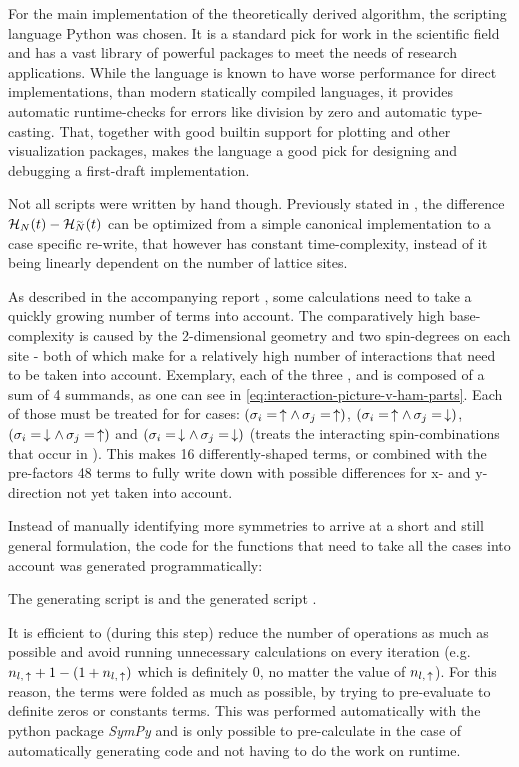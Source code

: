 For the main implementation of the theoretically derived algorithm, the scripting language Python was chosen.
It is a standard pick for work in the scientific field and has a vast library of powerful packages to meet the needs of research applications.
While the language is known to have worse performance for direct implementations, than modern statically compiled languages, it provides automatic runtime-checks for errors like division by zero and automatic type-casting.
That, together with good builtin support for plotting and other visualization packages, makes the language a good pick for designing and debugging a first-draft implementation.

Not all scripts were written by hand though.
Previously stated in , the difference $\HNOft - \HNOft[\vphantom{N}\smash{\tilde{N}}]$ can be optimized from a simple canonical implementation to a case specific re-write, that however has constant time-complexity, instead of it being linearly dependent on the number of lattice sites.

As described in the accompanying report , some calculations need to take a quickly growing number of terms into account.
The comparatively high base-complexity is caused by the 2-dimensional geometry and two spin-degrees on each site - both of which make for a relatively high number of interactions that need to be taken into account.
Exemplary, each of the three ,  and  is composed of a sum of 4 summands, as one can see in \autoref{eq:interaction-picture-v-ham-parts}.
Each of those must be treated for for cases: $(\sigma_i = \,\uparrow \land \,\sigma_j = \,\uparrow)$, $(\sigma_i = \,\uparrow \land \,\sigma_j = \,\downarrow)$, $(\sigma_i = \,\downarrow \land \,\sigma_j = \,\uparrow)$ and $(\sigma_i = \,\downarrow \land \,\sigma_j = \,\downarrow)$ (treats the interacting spin-combinations that occur in ).
This makes 16 differently-shaped terms, or combined with the pre-factors 48 terms to fully write down with possible differences for x- and y-direction not yet taken into account.

Instead of manually identifying more symmetries to arrive at a short and still general formulation, the code for the functions that need to take all the cases into account was generated programmatically:

The generating script is  and the generated script .

It is efficient to (during this step) reduce the number of operations as much as possible and avoid running unnecessary calculations on every iteration (e.g. $n_{l,\,\uparrow} + 1 - (1 + n_{l,\,\uparrow})$ which is definitely 0, no matter the value of $n_{l,\,\uparrow}$).
For this reason, the terms were folded as much as possible, by trying to pre-evaluate to definite zeros or constants terms.
This was performed automatically with the python package \emph{SymPy} \cite{sympyPackage} and is only possible to pre-calculate in the case of automatically generating code and not having to do the work on runtime.
